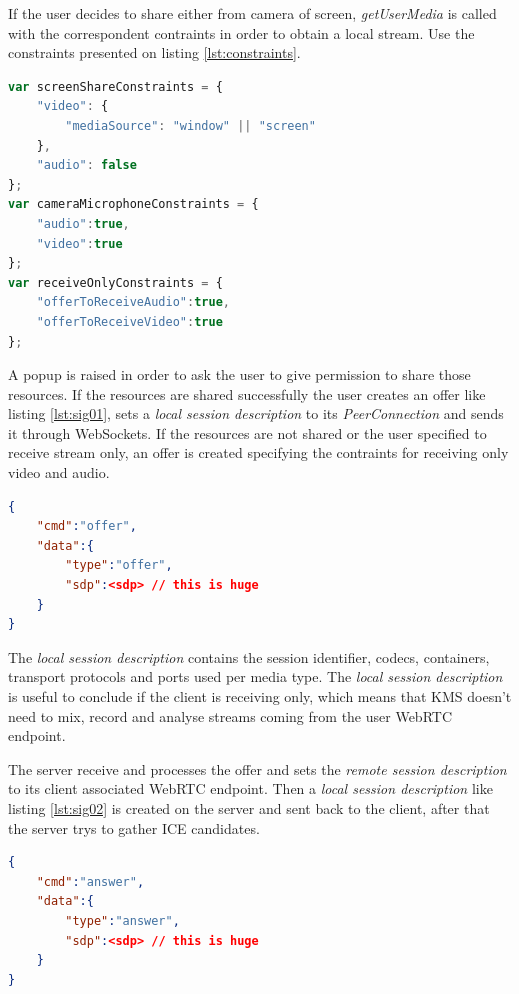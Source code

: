 If the user decides to share either from camera of screen, \emph{getUserMedia} is called with the correspondent contraints in order to obtain a local stream. Use the constraints presented on listing \ref{lst:constraints}. 

\begin{minipage}{\linewidth}
\begin{lstlisting}[caption={Media constraints},label={lst:constraints},language=JavaScript]
var screenShareConstraints = {	
	"video": {
		"mediaSource": "window" || "screen"
	}, 
	"audio": false
};
var cameraMicrophoneConstraints = {
	"audio":true, 
	"video":true 
};
var receiveOnlyConstraints = {
	"offerToReceiveAudio":true,
	"offerToReceiveVideo":true
};
\end{lstlisting}
\end{minipage}

A popup is raised in order to ask the user to give permission to share those resources. If the resources are shared successfully the user creates an offer like listing \ref{lst:sig01}, sets a \emph{local session description} to its \emph{PeerConnection} and sends it through WebSockets. If the resources are not shared or the user specified to receive stream only, an offer is created specifying the contraints for receiving only video and audio.

\begin{minipage}{\linewidth}
\begin{lstlisting}[caption={Offer created by client},label={lst:sig01},language=json]
{
	"cmd":"offer",
	"data":{
		"type":"offer",
		"sdp":<sdp>	// this is huge
	}
}
\end{lstlisting}
\end{minipage}

The \emph{local session description} contains the session identifier, codecs, containers, transport protocols and ports used per media type. The \emph{local session description} is useful to conclude if the client is receiving only, which means that \ac{KMS} doesn't need to mix, record and analyse streams coming from the user \ac{WebRTC} endpoint. 

The server receive and processes the offer and sets the \emph{remote session description} to its client associated \ac{WebRTC} endpoint. Then a \emph{local session description} like listing \ref{lst:sig02} is created on the server and sent back to the client, after that the server trys to gather \ac{ICE} candidates.

\begin{minipage}{\linewidth}
\begin{lstlisting}[caption={Answer created by KMS},label={lst:sig02},language=json]
{
	"cmd":"answer",
	"data":{
		"type":"answer",
		"sdp":<sdp>	// this is huge
	}
}
\end{lstlisting}
\end{minipage}

